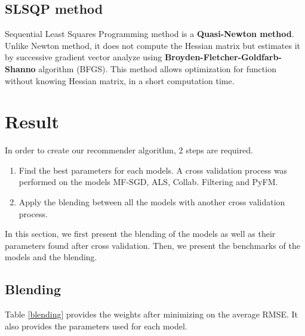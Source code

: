 \documentclass[10pt,conference,compsocconf]{IEEEtran}
\begin{document}
\subsection{SLSQP method}
Sequential Least Squares Programming method is a \textbf{Quasi-Newton method}. Unlike Newton method, it does not compute the Hessian matrix but estimates it by successive gradient vector analyze \cite{wiki:quasi_newton} using \textbf{Broyden-Fletcher-Goldfarb-Shanno} algorithm (BFGS). This method allows optimization for function without knowing Hessian matrix, in a short computation time.

\section{Result}

In order to create our recommender algorithm, 2 steps are required. 
\begin{enumerate}
\item Find the best parameters for each models. A cross validation process was performed on the models MF-SGD, ALS, Collab. Filtering and PyFM. %
\item Apply the blending between all the models with another cross validation process.%
\end{enumerate}
In this section, we first present the blending of the models as well as their parameters found after cross validation. Then, we present the benchmarks of the models and the blending.

\subsection{Blending}

Table \ref{blending} provides the weights after minimizing on the average RMSE. It also provides the parameters used for each model.
\end{document}
